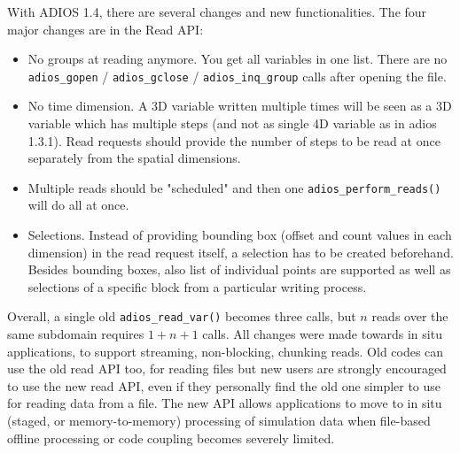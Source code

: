 With ADIOS 1.4, there are several changes and new functionalities.
The four major changes are in the Read API:

\begin{itemize}
\item No groups at reading anymore. You get all variables in one list.
There are no \verb+adios_gopen+ / \verb+adios_gclose+ / \verb+adios_inq_group+
calls after opening the file.
\item No time dimension. A 3D variable written multiple times will be seen as
a 3D variable which has multiple steps (and not as single 4D variable as in adios 1.3.1).
Read requests should provide the number of steps to be read at once separately from the
spatial dimensions.
\item Multiple reads should be "scheduled" and then one \verb+adios_perform_reads()+
will do all at once.
\item Selections. Instead of providing bounding box (offset and count values
in each dimension) in the read request itself, a selection has to be created
beforehand. Besides bounding boxes, also list of individual points are supported
as well as selections of a specific block from a particular writing process.
\end{itemize}

Overall, a single old \verb+adios_read_var()+ becomes three calls, but $n$ reads over the same subdomain requires $1+n+1$ calls.
All changes were made towards in situ applications, to support streaming, non-blocking, chunking reads.
Old codes can use the old read API too, for reading files but new users are strongly encouraged to use the new read API, even if they personally find the old one simpler to use for reading data from a file. The new API allows applications to move to in situ (staged, or memory-to-memory) processing of simulation data when file-based offline processing or code coupling becomes severely limited.

